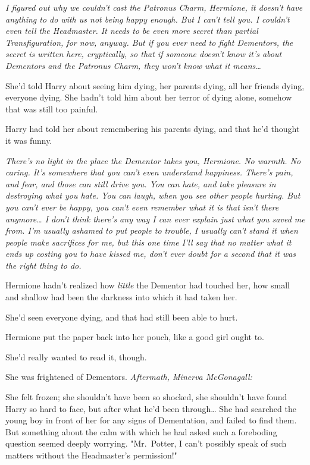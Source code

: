 \emph{I figured out why we couldn't cast the Patronus Charm, Hermione, it 
doesn't have anything to do with us not being happy enough. But I can't tell 
you. I couldn't even tell the Headmaster. It needs to be even more secret than 
partial Transfiguration, for now, anyway. But if you ever need to fight 
Dementors, the secret is written here, cryptically, so that if someone doesn't 
know it's about Dementors and the Patronus Charm, they won't know what it 
means{\ldots}}

She'd told Harry about seeing him dying, her parents dying, all her friends 
dying, everyone dying. She hadn't told him about her terror of dying alone, 
somehow that was still too painful.

Harry had told her about remembering his parents dying, and that he'd thought 
it was funny.

\emph{There's no light in the place the Dementor takes you, Hermione. No 
warmth. No caring. It's somewhere that you can't even understand happiness. 
There's pain, and fear, and those can still drive you. You can hate, and take 
pleasure in destroying what you hate. You can laugh, when you see other people 
hurting. But you can't ever be happy, you can't even remember what it is that 
isn't there anymore{\ldots} I don't think there's any way I can ever explain 
just what you saved me from. I'm usually ashamed to put people to trouble, I 
usually can't stand it when people make sacrifices for me, but this one time 
I'll say that no matter what it ends up costing you to have kissed me, don't 
ever doubt for a second that it was the right thing to do.}

Hermione hadn't realized how \emph{little} the Dementor had touched her, how 
small and shallow had been the darkness into which it had taken her.

She'd seen everyone dying, and that had still been able to hurt.

Hermione put the paper back into her pouch, like a good girl ought to.

She'd really wanted to read it, though.

She was frightened of Dementors.
\sbreak
\emph{Aftermath, Minerva McGonagall:}

She felt frozen; she shouldn't have been so shocked, she shouldn't have found 
Harry so hard to face, but after what he'd been through{\ldots} She had 
searched the young boy in front of her for any signs of Dementation, and failed 
to find them. But something about the calm with which he had asked such a 
foreboding question seemed deeply worrying. "Mr.~Potter, I can't possibly speak 
of such matters without the Headmaster's permission!"


